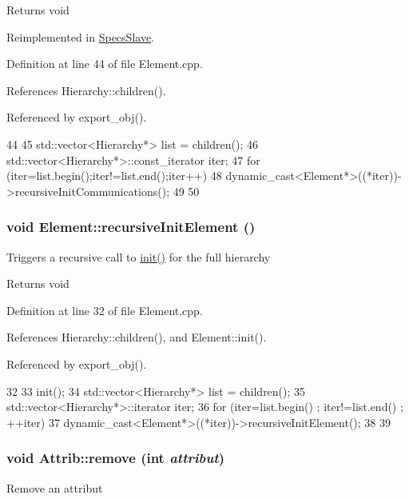 \begin{DoxyReturn}{Returns}
void 
\end{DoxyReturn}


Reimplemented in \hyperlink{classSpecsSlave_a347b94c2ba660ccde6927fe72590a1bc}{SpecsSlave}.

Definition at line 44 of file Element.cpp.

References Hierarchy::children().

Referenced by export\_\-obj().


\begin{DoxyCode}
44                                          {
45   std::vector<Hierarchy*> list = children();
46   std::vector<Hierarchy*>::const_iterator iter;
47   for (iter=list.begin();iter!=list.end();iter++){
48     dynamic_cast<Element*>((*iter))->recursiveInitCommunications();
49   }
50 }
\end{DoxyCode}
\hypertarget{classElement_a3c0abcb36f8906688bb7e32608df7086}{
\subsubsection[{recursiveInitElement}]{\setlength{\rightskip}{0pt plus 5cm}void Element::recursiveInitElement ()}}
\label{classElement_a3c0abcb36f8906688bb7e32608df7086}
Triggers a recursive call to \hyperlink{classElement_af42754b5cabc198869222725218d695c}{init()} for the full hierarchy

\begin{DoxyReturn}{Returns}
void 
\end{DoxyReturn}


Definition at line 32 of file Element.cpp.

References Hierarchy::children(), and Element::init().

Referenced by export\_\-obj().


\begin{DoxyCode}
32                                   {
33   init();
34   std::vector<Hierarchy*> list = children();
35   std::vector<Hierarchy*>::iterator iter;
36   for (iter=list.begin() ; iter!=list.end() ; ++iter){
37     dynamic_cast<Element*>((*iter))->recursiveInitElement();
38   }
39 }
\end{DoxyCode}
\hypertarget{classAttrib_a7d4ef7e32d93cb287792b87b857e79f3}{
\subsubsection[{remove}]{\setlength{\rightskip}{0pt plus 5cm}void Attrib::remove (int {\em attribut})}}
\label{classAttrib_a7d4ef7e32d93cb287792b87b857e79f3}
Remove an attribut 

